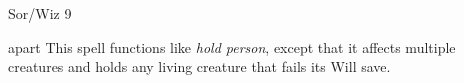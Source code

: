 
\begin{description*}
\item[Level:] Sor/Wiz 9
\end{description*}

apart
This spell functions like \textit{hold person}, except that it affects multiple
creatures and holds any living creature that fails its Will save.